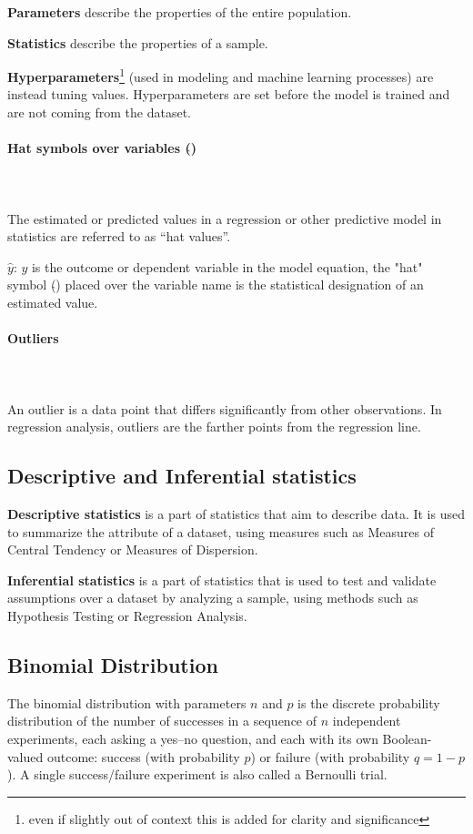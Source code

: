 \documentclass{article}
\begin{document}
\textbf{Parameters} describe the properties of the entire population.

\textbf{Statistics} describe the properties of a sample.

\textbf{Hyperparameters}\footnote{even if slightly out of context this is added for clarity and significance} (used in modeling and machine learning processes) are instead tuning values. Hyperparameters are set before the model is trained and are not coming from the dataset. 

\paragraph{Hat symbols over variables ($\hat{}$)}\mbox{} \\ 
\mbox{} \\
The estimated or predicted values in a regression or other predictive model in statistics are referred to as “hat values”. 

$\hat{y}$: $y$ is the outcome or dependent variable in the model equation, the "hat" symbol ($\hat{}$) placed over the variable name is the statistical designation of an estimated value.

\paragraph{Outliers}\mbox{} \\ 
\mbox{} \\
An outlier is a data point that differs significantly from other observations. 
In regression analysis, outliers are the farther points from the regression line.

\subsection{Descriptive and Inferential statistics}

\textbf{Descriptive statistics} is a part of statistics that aim to describe data. It is used to summarize the attribute of a dataset, using measures such as Measures of Central Tendency or Measures of Dispersion.

\textbf{Inferential statistics} is a part of statistics that is used to test and validate assumptions over a dataset by analyzing a sample, using methods such as Hypothesis Testing or Regression Analysis.

\subsection{Binomial Distribution}
The binomial distribution with parameters $n$ and $p$ is the discrete probability distribution of the number of successes in a sequence of $n$ independent experiments, each asking a yes–no question, and each with its own Boolean-valued outcome: success (with probability $p$) or failure (with probability $q=1-p$). 
A single success/failure experiment is also called a Bernoulli trial. 
\end{document}
